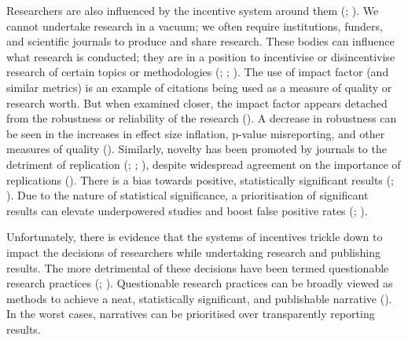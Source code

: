 \documentclass[10pt,a4paper]{article}
\begin{document}
Researchers are also influenced by the incentive system around them (; ).
We cannot undertake research in a vacuum; we often require institutions, funders, and scientific journals to produce and share research.
These bodies can influence what research is conducted; they are in a position to incentivise or disincentivise research of certain topics or methodologies (; ; ).
The use of impact factor (and similar metrics) is an example of citations being used as a measure of quality or research worth.
But when examined closer, the impact factor appears detached from the robustness or reliability of the research ().
A decrease in robustness can be seen in the increases in effect size inflation, p-value misreporting, and other measures of quality ().
Similarly, novelty has been promoted by journals to the detriment of replication (; ; ), despite widespread agreement on the importance of replications ().
There is a bias towards positive, statistically significant results (; ).
Due to the nature of statistical significance, a prioritisation of significant results can elevate underpowered studies and boost false positive rates (; ).

Unfortunately, there is evidence that the systems of incentives trickle down to impact the decisions of researchers while undertaking research and publishing results.
The more detrimental of these decisions have been termed questionable research practices (; ).
Questionable research practices can be broadly viewed as methods to achieve a neat, statistically significant, and publishable narrative ().
In the worst cases, narratives can be prioritised over transparently reporting results.
\end{document}
